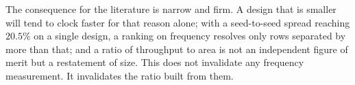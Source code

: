 The consequence for the literature is narrow and firm. A design that is smaller
will tend to clock faster for that reason alone; with a seed-to-seed spread
reaching $20.5\%$ on a single design, a ranking on frequency resolves only rows
separated by more than that; and a ratio of throughput to area is not an
independent figure of merit but a restatement of size. This does not invalidate
any frequency measurement. It invalidates the ratio built from them.

%
